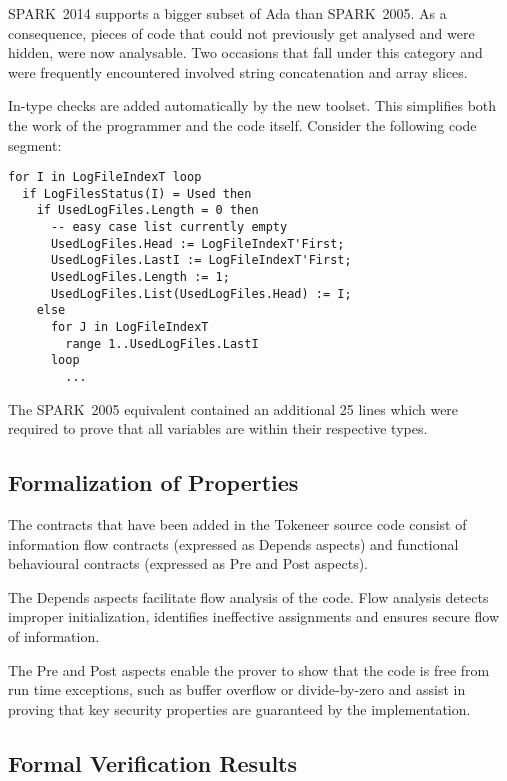 \documentclass[10pt,a4paper,twocolumn]{article}
\newcommand{\oldspark}{SPARK~2005\xspace}
\newcommand{\newspark}{SPARK~2014\xspace}
\begin{document}
\newspark supports a bigger subset of Ada than \oldspark. As a
consequence, pieces of code that could not previously get analysed and
were hidden, were now analysable. Two occasions that fall under this
category and were frequently encountered involved string concatenation
and array slices.

In-type checks are added automatically by the new toolset. This
simplifies both the work of the programmer and the code
itself. Consider the following code segment:
\begin{lstlisting}
for I in LogFileIndexT loop
  if LogFilesStatus(I) = Used then
    if UsedLogFiles.Length = 0 then
      -- easy case list currently empty
      UsedLogFiles.Head := LogFileIndexT'First;
      UsedLogFiles.LastI := LogFileIndexT'First;
      UsedLogFiles.Length := 1;
      UsedLogFiles.List(UsedLogFiles.Head) := I;
    else
      for J in LogFileIndexT
        range 1..UsedLogFiles.LastI
      loop
        ...
\end{lstlisting}
The \oldspark equivalent contained an additional 25 lines which were
required to prove that all variables are within their respective
types. 


\subsection{Formalization of Properties}

The contracts that have been added in the Tokeneer source code consist
of information flow contracts (expressed as Depends aspects) and
functional behavioural contracts (expressed as Pre and Post aspects).

The Depends aspects facilitate flow analysis of the code. Flow
analysis detects improper initialization, identifies ineffective
assignments and ensures secure flow of information.

The Pre and Post aspects enable the prover to show that the code is
free from run time exceptions, such as buffer overflow or
divide-by-zero and assist in proving that key security properties are
guaranteed by the implementation.

\subsection{Formal Verification Results}
\end{document}
